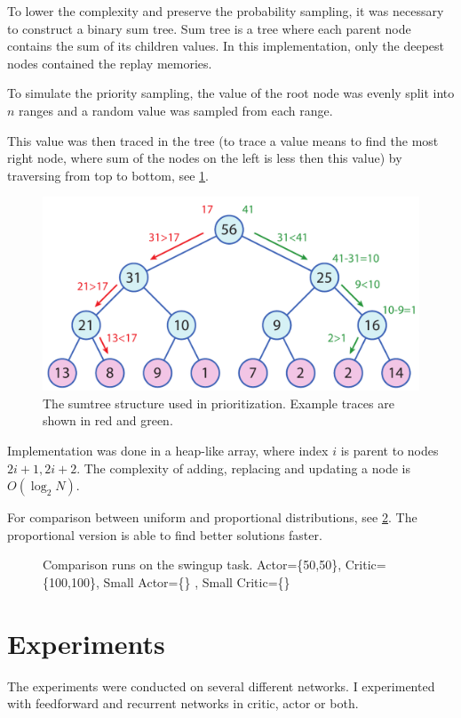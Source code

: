 To lower the complexity and preserve the probability sampling, it was necessary to construct a binary sum tree. Sum tree is a tree where each parent node contains the sum of its children values. In this implementation, only the deepest nodes contained the replay memories. 

To simulate the priority sampling, the value of the root node was evenly split into $n$ ranges and a random value was sampled from each range.

This value was then traced in the tree (to trace a value means to find the most right node, where sum of the nodes on the left is less then this value) by traversing from top to bottom, see \ref{fig:sumtree}.

\begin{figure}
\includegraphics[width=\textwidth]{images/ddpg/sumtree.pdf}
\caption{The sumtree structure used in prioritization. Example traces are shown in red and green.}
\label{fig:sumtree}
\end{figure}

Implementation was done in a heap-like array, where index $i$ is parent to nodes $2i+1, 2i+2$. The complexity of adding, replacing and updating a node is $O(\log_2N)$.

For comparison between uniform and proportional distributions, see \ref{plot:prior}. The proportional version is able to find better solutions faster.
\begin{figure}[htbp]

\caption{Comparison runs on the swingup task. Actor=\{50,50\}, Critic=\{100,100\}, Small Actor=\{\}
, Small Critic=\{\}}
\centering
\label{plot:prior}
\end{figure}

\section{Experiments}
The experiments were conducted on several different networks. I experimented with feedforward and recurrent networks in critic, actor or both. 

